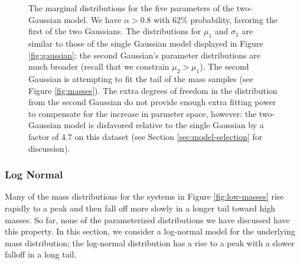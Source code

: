 \documentclass[preprint]{aastex}
\begin{document}
\begin{figure}
  \begin{center}
  \end{center}
  \caption{\label{fig:two-gaussian} The marginal distributions for the
    five parameters of the two-Gaussian model.  We have $\alpha > 0.8$
    with 62\% probability, favoring the first of the two Gaussians.
    The distributions for $\mu_1$ and $\sigma_1$ are similar to those
    of the single Gaussian model displayed in Figure
    \ref{fig:gaussian}; the second Gaussian's parameter distributions
    are much broader (recall that we constrain $\mu_2 > \mu_1$).  The
    second Gaussian is attempting to fit the tail of the mass samples
    (see Figure \ref{fig:masses}).  The extra degrees of freedom in
    the distribution from the second Gaussian do not provide enough
    extra fitting power to compensate for the increase in parmeter
    space, however: the two-Gaussian model is disfavored relative to
    the single Gaussian by a factor of $4.7$ on this dataset (see
    Section \ref{sec:model-selection} for discussion).}
\end{figure}

\subsubsection{Log Normal}
\label{sec:log-normal}

Many of the mass distributions for the systems in Figure
\ref{fig:low-masses} rise rapidly to a peak and then fall off more
slowly in a longer tail toward high masses.  So far, none of the
parameterized distributions we have discussed have this property.  In
this section, we consider a log-normal model for the underlying mass
distribution; the log-normal distribution has a rise to a peak with a
slower falloff in a long tail.  
\end{document}
